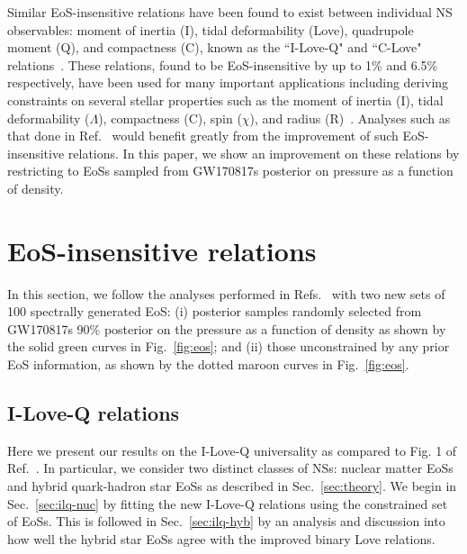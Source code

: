 \documentclass[prd,twocolumn,nofootinbib,superscriptaddress,amsmath,amssymb]{revtex4-1}
\begin{document}
Similar EoS-insensitive relations have been found to exist between individual NS observables: moment of inertia (I), tidal deformability (Love), quadrupole moment (Q), and compactness (C), known as the ``I-Love-Q" and ``C-Love" relations~\cite{Yagi:ILQ, Yagi:binLove}.
These relations, found to be EoS-insensitive by up to 1\% and 6.5\% respectively, have been used for many important applications including deriving constraints on several stellar properties such as the moment of inertia (I), tidal deformability ($\Lambda$), compactness (C), spin ($\chi$), and radius (R)~\cite{Kumar:2019xgp}.
Analyses such as that done in Ref.~\cite{Kumar:2019xgp} would benefit greatly from the improvement of such EoS-insensitive relations.
In this paper, we show an improvement on these relations by restricting to EoSs sampled from GW170817s posterior on pressure as a function of density.


\section{EoS-insensitive relations}\label{sec:universal}
In this section, we follow the analyses performed in Refs.~\cite{Yagi:binLove,Yagi:ILQ} with two new sets of 100 spectrally generated EoS: (i) posterior samples randomly selected from GW170817s 90\% posterior on the pressure as a function of density as shown by the solid green curves in Fig.~\ref{fig:eos}; and (ii) those unconstrained by any prior EoS information, as shown by the dotted maroon curves in Fig.~\ref{fig:eos}.


\subsection{I-Love-Q relations}\label{sec:ilq}
Here we present our results on the I-Love-Q universality as compared to Fig. 1 of Ref.~\cite{Yagi:ILQ}.
In particular, we consider two distinct classes of NSs: nuclear matter EoSs and hybrid quark-hadron star EoSs as described in Sec.~\ref{sec:theory}.
We begin in Sec.~\ref{sec:ilq-nuc} by fitting the new I-Love-Q relations using the constrained set of EoSs.
This is followed in Sec.~\ref{sec:ilq-hyb} by an analysis and discussion into how well the hybrid star EoSs agree with the improved binary Love relations. 
\end{document}

